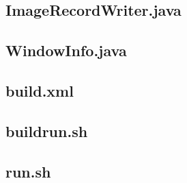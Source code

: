 \documentclass[12pt,a4paper]{extarticle} %
\begin{document}
\subsection*{ImageRecordWriter.java}

\subsection*{WindowInfo.java}

\subsection*{build.xml}

\subsection*{buildrun.sh}

\subsection*{run.sh}

%
%
\end{document}
